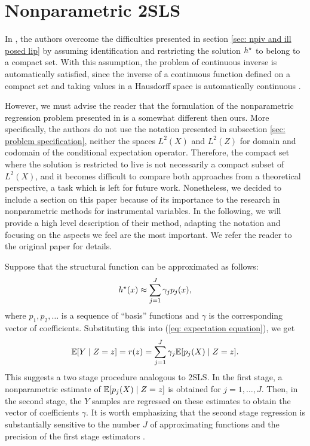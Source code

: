 \section{Nonparametric 2SLS}

In \cite{newey2003}, the authors overcome the difficulties presented in section \ref{sec: npiv and ill posed lip} by assuming identification and restricting the solution $ h^{ \star } $ to belong to a compact set.
With this assumption, the problem of continuous inverse is automatically satisfied, since the inverse of a continuous function defined on a compact set and taking values in a Hausdorff space is automatically continuous \cite{munkres2000}.

However, we must advise the reader that the formulation of the nonparametric regression problem presented in \cite{newey2003} is a somewhat different then ours.
More specifically, the authors do not use the notation presented in subsection \ref{sec: problem specification}, neither the spaces $ L^2 ( X ) $ and $ L^2 ( Z ) $ for domain and codomain of the conditional expectation operator.
Therefore, the compact set where the solution is restricted to live is not necessarily a compact subset of $ L^{ 2 } ( X ) $, and it becomes difficult to compare both approaches from a theoretical perspective, a task which is left for future work.
Nonetheless, we decided to include a section on this paper because of its importance to the research in nonparametric methods for instrumental variables.
In the following, we will provide a high level description of their method, adapting the notation and focusing on the aspects we feel are the most important.
We refer the reader to the original paper for details.

Suppose that the structural function can be approximated as follows:
\begin{equation}
    \label{eq: expansion on basis functions}
    h^{ \star } ( x ) \approx \sum_{ j=1 }^{ J } \gamma_{ j } p_{ j } ( x )
,\end{equation}
where $ p_{ 1 }, p_{ 2 }, \dots $ is a sequence of ``basis'' functions and $ \gamma $ is the corresponding vector of coefficients.
Substituting this into (\ref{eq: expectation equation}), we get
\begin{equation}
    \label{eq: projected expansion}
    \mathbb{E} [ Y \mid Z = z ] = r ( z ) = \sum_{ j=1 }^{ J } \gamma_{ j } \mathbb{E} [ p_{ j } ( X ) \mid Z = z ]
.\end{equation}
This suggests a two stage procedure analogous to 2SLS.
In the first stage, a nonparametric estimate of $ \mathbb{E} [ p_{ j } ( X ) \mid Z = z ] $ is obtained for $ j = 1, \dots, J $.
Then, in the second stage, the $ Y $ samples are regressed on these estimates to obtain the vector of coefficients $ \gamma $.
It is worth emphasizing that the second stage regression is substantially sensitive to the number $ J $ of approximating functions and the precision of the first stage estimators \cite{newey2003}.

